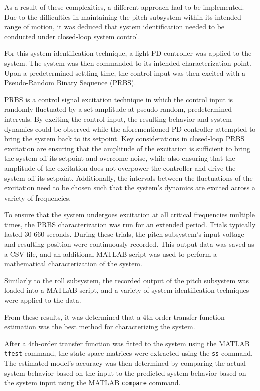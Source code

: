 As a result of these complexities, a different approach had to be implemented. Due to the difficulties in maintaining the pitch subsystem within its intended range of motion, it was deduced that system identification needed to be conducted under closed-loop system control.

For this system identification technique, a light PD controller was applied to the system. The system was then commanded to its intended characterization point. Upon a predetermined settling time, the control input was then excited with a Pseudo-Random Binary Sequence (PRBS).

PRBS is a control signal excitation technique in which the control input is randomly fluctuated by a set amplitude at pseudo-random, predetermined intervals. By exciting the control input, the resulting behavior and system dynamics could be observed while the aforementioned PD controller attempted to bring the system back to its setpoint. Key considerations in closed-loop PRBS excitation are ensuring that the amplitude of the excitation is sufficient to bring the system off its setpoint and overcome noise, while also ensuring that the amplitude of the excitation does not overpower the controller and drive the system off its setpoint. Additionally, the intervals between the fluctuations of the excitation need to be chosen such that the system's dynamics are excited across a variety of frequencies.

To ensure that the system undergoes excitation at all critical frequencies multiple times, the PRBS characterization was run for an extended period. Trials typically lasted 30-660 seconds. During these trials, the pitch subsystem's input voltage and resulting position were continuously recorded. This output data was saved as a CSV file, and an additional MATLAB script was used to perform a mathematical characterization of the system.

Similarly to the roll subsystem, the recorded output of the pitch subsystem was loaded into a MATLAB script, and a variety of system identification techniques were applied to the data.

From these results, it was determined that a 4th-order transfer function estimation was the best method for characterizing the system.

After a 4th-order transfer function was fitted to the system using the MATLAB \texttt{tfest} command, the state-space matrices were extracted using the \texttt{ss} command. The estimated model's accuracy was then determined by comparing the actual system behavior based on the input to the predicted system behavior based on the system input using the MATLAB \texttt{compare} command.

